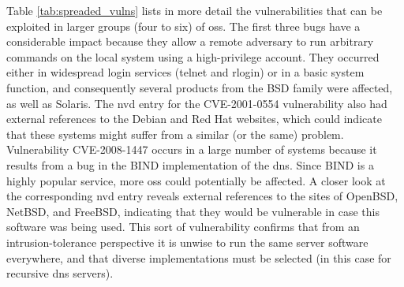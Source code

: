 Table \ref{tab:spreaded_vulns} lists in more detail the vulnerabilities that can be exploited in larger groups (four to six) of \glspl{os}. 
The first three bugs have a considerable impact because they allow a remote adversary to run arbitrary commands on the local system using a high-privilege account. 
They occurred either in widespread login services (telnet and rlogin) or in a basic system function, and consequently several products from the BSD family were affected, as well as Solaris. 
The \gls{nvd} entry for the CVE-2001-0554 vulnerability also had external references to the Debian and Red Hat websites, which could indicate that these systems might suffer from a similar (or the same) problem. 
Vulnerability CVE-2008-1447 occurs in a large number of systems because it results from a bug in the BIND implementation of the \gls{dns}. Since BIND is a highly popular service, more \glspl{os} could potentially be affected. 
A closer look at the corresponding \gls{nvd} entry reveals external references to the sites of OpenBSD, NetBSD, and FreeBSD, indicating that they would be vulnerable in case this software was being used. 
This sort of vulnerability confirms that from an intrusion-tolerance perspective it is unwise to run the same server software everywhere, and that diverse implementations must be selected (in this case for recursive \gls{dns} servers).

